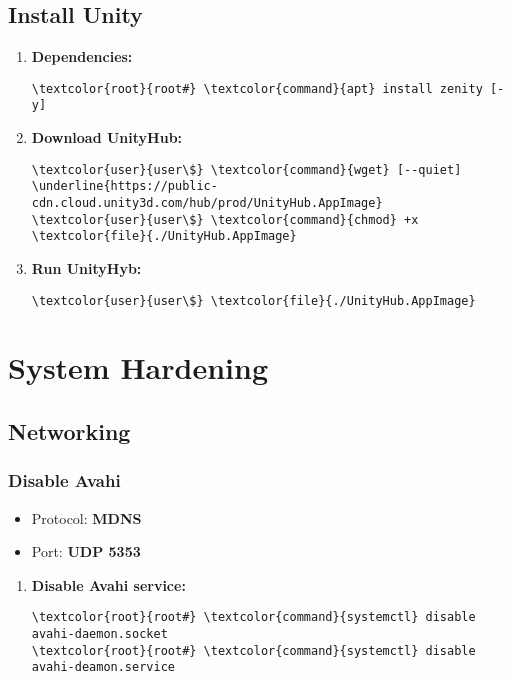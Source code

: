 \documentclass[10pt, a4paper, onecolumn, openany]{book} %
\begin{document}
\section{Install Unity}
\begin{enumerate}
    \item \textbf{Dependencies:}
\begin{Verbatim}[commandchars=\\\{\}]
\textcolor{root}{root#} \textcolor{command}{apt} install zenity [-y]
\end{Verbatim}
    \item \textbf{Download UnityHub:}
\begin{Verbatim}[commandchars=\\\{\}]
\textcolor{user}{user\$} \textcolor{command}{wget} [--quiet] 
\underline{https://public-cdn.cloud.unity3d.com/hub/prod/UnityHub.AppImage}
\textcolor{user}{user\$} \textcolor{command}{chmod} +x \textcolor{file}{./UnityHub.AppImage}
\end{Verbatim}
    \item \textbf{Run UnityHyb:}
\begin{Verbatim}[commandchars=\\\{\}]
\textcolor{user}{user\$} \textcolor{file}{./UnityHub.AppImage}
\end{Verbatim}
\end{enumerate}
\chapter{System Hardening}
\section{Networking}
\subsection{Disable Avahi}
\begin{itemize}
    \item Protocol: \textbf{MDNS}
    \item Port: \textbf{UDP 5353}
\end{itemize}
\begin{enumerate}
    \item \textbf{Disable Avahi service:}
\begin{Verbatim}[commandchars=\\\{\}]
\textcolor{root}{root#} \textcolor{command}{systemctl} disable avahi-daemon.socket
\textcolor{root}{root#} \textcolor{command}{systemctl} disable avahi-deamon.service
\end{Verbatim}
\end{enumerate}
\end{document}
